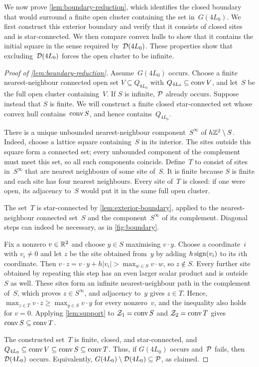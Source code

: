 \documentclass[11pt,letterpaper]{article}
\begin{document}
We now prove \cref{lem:boundary-reduction}, which identifies the closed boundary that would surround a finite open cluster containing the set in~$G(4L_0)$. We first construct this exterior boundary and verify that it consists of closed sites and is star-connected. We then compare convex hulls to show that it contains the initial square in the sense required by~$\mathcal D(4L_0)$. These properties show that excluding~$\mathcal D(4L_0)$ forces the open cluster to be infinite.

\begin{proof}[Proof of \cref{lem:boundary-reduction}]
Assume~$G(4L_0)$ occurs. Choose a finite nearest-neighbour connected open set $V\subseteq Q_{8L_0}$ with $Q_{4L_0}\subseteq\operatorname{conv} V$, and let~$S$ be the full open cluster containing~$V$. If $S$ is infinite, $\mathcal P$ already occurs. Suppose instead that $S$ is finite. We will construct a finite closed star-connected set whose convex hull contains~$\operatorname{conv} S$, and hence contains~$Q_{4L_0}$.

There is a unique unbounded nearest-neighbour component~$S^\infty$ of $h\mathbb Z^2\setminus S$. Indeed, choose a lattice square containing~$S$ in its interior. The sites outside this square form a connected set; every unbounded component of the complement must meet this set, so all such components coincide. Define~$T$ to consist of sites in~$S^\infty$ that are nearest neighbours of some site of~$S$. It is finite because $S$ is finite and each site has four nearest neighbours. Every site of~$T$ is closed: if one were open, its adjacency to~$S$ would put it in the same full open cluster.

The set~$T$ is star-connected by \cref{lem:exterior-boundary}, applied to the nearest-neighbour connected set~$S$ and the component~$S^\infty$ of its complement. Diagonal steps can indeed be necessary, as in \cref{fig:boundary}.

Fix a nonzero $v\in\mathbb R^2$ and choose $y\in S$ maximising $v\cdot y$. Choose a coordinate~$i$ with $v_i\neq0$ and let $z$ be the site obtained from~$y$ by adding $h\operatorname{sign}(v_i)$ to its $i$th coordinate. Then $v\cdot z=v\cdot y+h\lvert v_i\rvert>\max_{w\in S}v\cdot w$, so $z\notin S$. Every further site obtained by repeating this step has an even larger scalar product and is outside~$S$ as well. These sites form an infinite nearest-neighbour path in the complement of~$S$, which proves $z\in S^\infty$, and adjacency to~$y$ gives $z\in T$. Hence, $\max_{z\in T}v\cdot z\ge\max_{y\in S}v\cdot y$ for every nonzero~$v$, and the inequality also holds for $v=0$. Applying \cref{lem:support} to $\mathcal Z_1=\operatorname{conv} S$ and $\mathcal Z_2=\operatorname{conv} T$ gives $\operatorname{conv} S\subseteq\operatorname{conv} T$.

The constructed set~$T$ is finite, closed, and star-connected, and $Q_{4L_0}\subseteq\operatorname{conv} V\subseteq\operatorname{conv} S\subseteq\operatorname{conv} T$. Thus, if $G(4L_0)$ occurs and~$\mathcal P$ fails, then~$\mathcal D(4L_0)$ occurs. Equivalently, $G(4L_0)\setminus\mathcal D(4L_0)\subseteq\mathcal P$, as claimed.
\end{proof}
\end{document}

